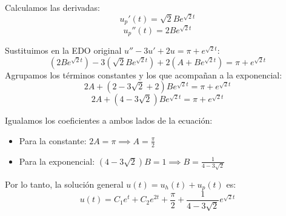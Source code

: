 {\begin{enumerate} [label=\alph*)]
            Calculamos las derivadas:
            $$u_p'(t) = \sqrt{2}B e^{\sqrt{2}t}$$
            $$u_p''(t) = 2B e^{\sqrt{2}t}$$

            Sustituimos en la EDO original $u'' - 3u' + 2u = \pi + e^{\sqrt{2}t}$:
            $$(2B e^{\sqrt{2}t}) - 3(\sqrt{2}B e^{\sqrt{2}t}) + 2(A + B e^{\sqrt{2}t}) = \pi + e^{\sqrt{2}t}$$
            Agrupamos los términos constantes y los que acompañan a la exponencial:
            $$2A + (2 - 3\sqrt{2} + 2)B e^{\sqrt{2}t} = \pi + e^{\sqrt{2}t}$$
            $$2A + (4 - 3\sqrt{2})B e^{\sqrt{2}t} = \pi + e^{\sqrt{2}t}$$

            Igualamos los coeficientes a ambos lados de la ecuación:
            \begin{itemize}
                \item Para la constante: $2A = \pi \implies A = \frac{\pi}{2}$
                \item Para la exponencial: $(4 - 3\sqrt{2})B = 1 \implies B = \frac{1}{4 - 3\sqrt{2}}$
            \end{itemize}

            Por lo tanto, la solución general $u(t) = u_h(t) + u_p(t)$ es:
            $$u(t) = C_1 e^t + C_2 e^{2t} + \frac{\pi}{2} + \frac{1}{4 - 3\sqrt{2}} e^{\sqrt{2}t}$$            
    \end{enumerate}
}


